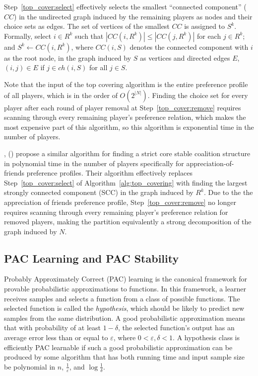 \documentclass[letterpaper]{article} %
\newcommand{\citename}[1]{\citeauthor{#1}, (\citeyear{#1})}
\newcommand{\ch}{\mathit{ch}}
\newcommand{\CC}{\mathit{CC}}
\theoremstyle{definition}
\begin{document}
Step~\ref{top_cover:select} effectively selects the smallest ``connected component'' ($\CC$) in the undirected graph induced by the remaining players as nodes and their choice sets as edges. The set of vertices of the smallest $CC$ is assigned to $S^k$. Formally, select $i\in R^k$ such that $|\CC(i,R^k)| \leq |\CC(j,R^k)|$ for each $j\in R^k$; and $S^k\leftarrow \CC(i,R^k)$, where $\CC(i, S)$ denotes the connected component with $i$ as the root node, in the graph induced by $S$ as vertices and directed edges $E$, $(i, j) \in E$ if $j \in \ch(i, S)$ for all $j \in S$.

Note that the input of the top covering algorithm is the entire preference profile of all players, which is in the order of $O(2^{|N|})$. Finding the choice set for every player after each round of player removal at Step~\ref{top_cover:remove} requires scanning through every remaining player's preference relation, which makes the most expensive part of this algorithm, so this algorithm is exponential time in the number of players.

\citename{Dimitrov2006} propose a similar algorithm for finding a strict core stable coalition structure in polynomial time in the number of players specifically for appreciation-of-friends preference profiles. Their algorithm effectively replaces Step~\ref{top_cover:select} of Algorithm~\ref{alg:top_covering} with finding the largest strongly connected component (SCC) in the graph induced by $R^k$. Due to the the appreciation of friends preference profile, Step~\ref{top_cover:remove} no longer requires scanning through every remaining player's preference relation for removed players, making the partition equivalently a strong decomposition of the graph induced by $N$.

\subsection{PAC Learning and PAC Stability}
Probably Approximately Correct (PAC) learning is the canonical framework for provable probabilistic approximations to functions. In this framework, a learner receives samples and selects a function from a class of possible functions. The selected function is called the {\it hypothesis}, which should be likely to predict new samples from the same distribution. A good probabilistic approximation means that with probability of at least $1 - \delta$, the selected function's output has an average error less than or equal to $\varepsilon$, where $0 < \varepsilon, \delta < 1$. A hypothesis class is efficiently PAC learnable if such a good probabilistic approximation can be produced by some algorithm that has both running time and input sample size be polynomial in $n$, $\frac{1}{\varepsilon}$, and $\log{\frac{1}{\delta}}$.
\end{document}
